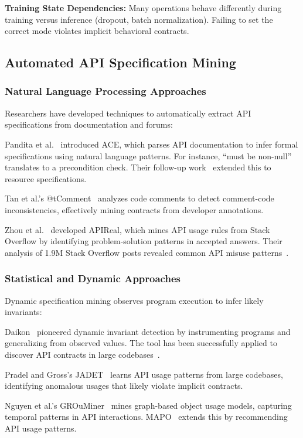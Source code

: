 \documentclass[11pt]{article}
\begin{document}
\textbf{Training State Dependencies:} Many operations behave differently during training versus inference (dropout, batch normalization). Failing to set the correct mode violates implicit behavioral contracts.

\subsection{Automated API Specification Mining}

\subsubsection{Natural Language Processing Approaches}
Researchers have developed techniques to automatically extract API specifications from documentation and forums:

Pandita et al.~\cite{pandita2012inferring} introduced ACE, which parses API documentation to infer formal specifications using natural language patterns. For instance, ``must be non-null'' translates to a precondition check. Their follow-up work~\cite{zhong2009inferring} extended this to resource specifications.

Tan et al.'s @tComment~\cite{tan2012tcomment} analyzes code comments to detect comment-code inconsistencies, effectively mining contracts from developer annotations.

Zhou et al.~\cite{zhou2017analyzing} developed APIReal, which mines API usage rules from Stack Overflow by identifying problem-solution patterns in accepted answers. Their analysis of 1.9M Stack Overflow posts revealed common API misuse patterns~\cite{uddin2019mining}.

\subsubsection{Statistical and Dynamic Approaches}
Dynamic specification mining observes program execution to infer likely invariants:

Daikon~\cite{ernst2007daikon} pioneered dynamic invariant detection by instrumenting programs and generalizing from observed values. The tool has been successfully applied to discover API contracts in large codebases~\cite{ernst2001dynamically}.

Pradel and Gross's JADET~\cite{pradel2011detecting} learns API usage patterns from large codebases, identifying anomalous usages that likely violate implicit contracts.

Nguyen et al.'s GROuMiner~\cite{nguyen2009graph} mines graph-based object usage models, capturing temporal patterns in API interactions. MAPO~\cite{zhong2009mapo} extends this by recommending API usage patterns.
\end{document}
